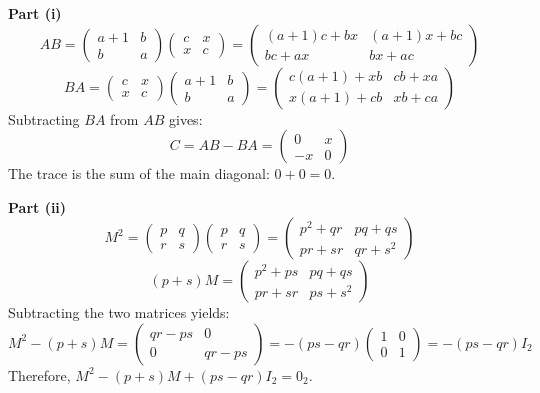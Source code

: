 \begin{solution}
\textbf{Part (i)}
$$AB = \begin{pmatrix} a+1 & b \\ b & a \end{pmatrix} \begin{pmatrix} c & x \\ x & c \end{pmatrix} = \begin{pmatrix} (a+1)c+bx & (a+1)x+bc \\ bc+ax & bx+ac \end{pmatrix}$$
$$BA = \begin{pmatrix} c & x \\ x & c \end{pmatrix} \begin{pmatrix} a+1 & b \\ b & a \end{pmatrix} = \begin{pmatrix} c(a+1)+xb & cb+xa \\ x(a+1)+cb & xb+ca \end{pmatrix}$$
Subtracting $BA$ from $AB$ gives:
$$C = AB - BA = \begin{pmatrix} 0 & x \\ -x & 0 \end{pmatrix}$$
The trace is the sum of the main diagonal: $0 + 0 = 0$.

\textbf{Part (ii)}
$$M^2 = \begin{pmatrix} p & q \\ r & s \end{pmatrix} \begin{pmatrix} p & q \\ r & s \end{pmatrix} = \begin{pmatrix} p^2+qr & pq+qs \\ pr+sr & qr+s^2 \end{pmatrix}$$
$$(p+s)M = \begin{pmatrix} p^2+ps & pq+qs \\ pr+sr & ps+s^2 \end{pmatrix}$$
Subtracting the two matrices yields:
$$M^2 - (p+s)M = \begin{pmatrix} qr-ps & 0 \\ 0 & qr-ps \end{pmatrix} = -(ps-qr) \begin{pmatrix} 1 & 0 \\ 0 & 1 \end{pmatrix} = -(ps-qr)I_2$$
Therefore, $M^2 - (p+s)M + (ps-qr)I_2 = 0_2$.


\end{solution}
